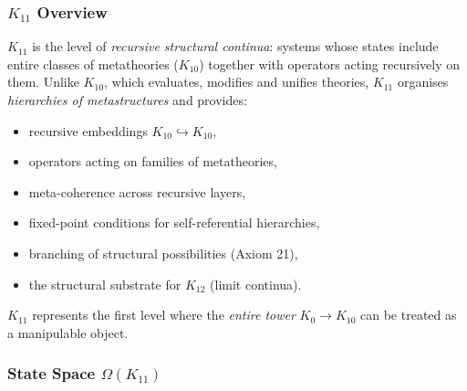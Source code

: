 

\subsubsection{$K_{11}$ Overview}
\label{sec:k11-overview}

$K_{11}$ is the level of \emph{recursive structural continua}: systems whose
states include entire classes of metatheories ($K_{10}$) together with
operators acting recursively on them. Unlike $K_{10}$, which evaluates,
modifies and unifies theories, $K_{11}$ organises \emph{hierarchies of
metastructures} and provides:
\begin{itemize}
    \item recursive embeddings $K_{10}\hookrightarrow K_{10}$,
    \item operators acting on families of metatheories,
    \item meta-coherence across recursive layers,
    \item fixed-point conditions for self-referential hierarchies,
    \item branching of structural possibilities (Axiom 21),
    \item the structural substrate for $K_{12}$ (limit continua).
\end{itemize}

$K_{11}$ represents the first level where the \emph{entire tower} $K_0 \to K_{10}$
can be treated as a manipulable object.

\subsubsection{State Space $\Omega(K_{11})$}

